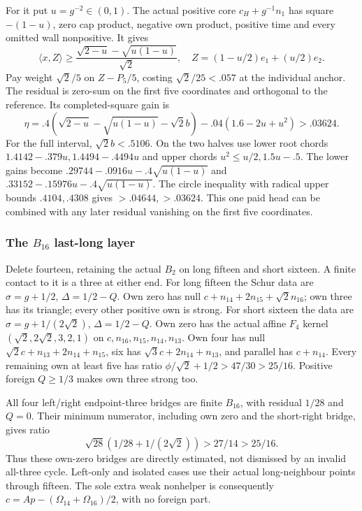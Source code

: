 \documentclass[11pt]{article}
\theoremstyle{definition}
\theoremstyle{remark}
\newcommand{\ip}[2]{\langle #1,#2\rangle}
\begin{document}
For it put \(u=g^{-2}\in(0,1)\). The actual positive core
\(c_H+g^{-1}n_1\) has square \(-(1-u)\), zero cap product,
negative own product, positive time and every omitted wall nonpositive.
It gives
\[
 \ip xZ\ge{\frac{\sqrt{2-u}-\sqrt{u(1-u)}}{\sqrt2}},
 \quad Z=(1-u/2)e_1+(u/2)e_2.
\]
Pay weight \(\sqrt2/5\) on \(Z-P_5/5\), costing
\(\sqrt2/25<.057\) at the individual anchor. The residual
is zero-sum on the first five coordinates and orthogonal to the
reference. Its completed-square gain is
\[
 \eta=.4(\sqrt{2-u}-\sqrt{u(1-u)}-\sqrt2b)
                  -.04(1.6-2u+u^2)>.03624.
\]
For the full interval, \(\sqrt2b<.5106\). On the two halves use
lower root chords \(1.4142-.379u,1.4494-.4494u\) and upper
chords \(u^2\le u/2,1.5u-.5\). The lower gains become
\(.29744-.0916u-.4\sqrt{u(1-u)}\) and
\(.33152-.15976u-.4\sqrt{u(1-u)}\).
The circle inequality with radical upper bounds \(.4104,.4308\)
gives \(>.04644,>.03624\). This one paid head can be combined
with any later residual vanishing on the first five coordinates.

\subsubsection[The B16 last-long layer]{The \(B_{16}\) last-long layer}
Delete fourteen, retaining the actual \(B_2\) on long fifteen
and short sixteen. A finite contact to it is a three at either end.
For long fifteen the Schur data are \(\sigma=g+1/2\),
\(\Delta=1/2-Q\). Own zero has null
\(c+n_{14}+2n_{15}+\sqrt2n_{16}\); own three has its triangle;
every other positive own is strong.
For short sixteen the data are \(\sigma=g+1/(2\sqrt2)\),
\(\Delta=1/2-Q\). Own zero has the actual affine \(F_4\)
kernel \((\sqrt2,2\sqrt2,3,2,1)\) on
\(c,n_{16},n_{15},n_{14},n_{13}\). Own four has null
\(\sqrt2c+n_{13}+2n_{14}+n_{15}\), six has
\(\sqrt3c+2n_{14}+n_{13}\), and parallel has \(c+n_{14}\).
Every remaining own at least five has ratio
\(\phi/\sqrt2+1/2>47/30>25/16\). Positive foreign
\(Q\ge1/3\) makes own three strong too.

All four left/right endpoint-three bridges are finite \(B_{16}\),
with residual \(1/28\) and \(Q=0\). Their minimum numerator,
including own zero and the short-right bridge, gives ratio
\[
 \sqrt{28}(1/28+1/(2\sqrt2))>27/14>25/16.
\]
Thus these own-zero bridges are directly estimated, not dismissed
by an invalid all-three cycle. Left-only and isolated cases use
their actual long-neighbour points through fifteen. The sole extra
weak nonhelper is consequently
\(c=Ap-(\Omega_{14}+\Omega_{16})/2\), with no foreign part.
\end{document}
